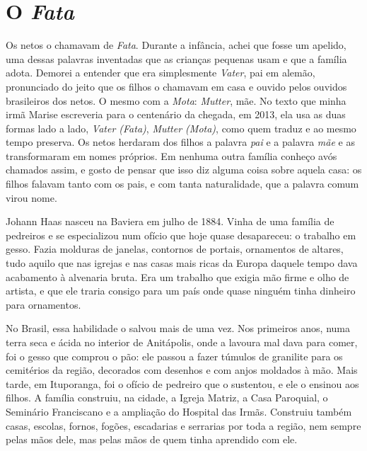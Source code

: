 \documentclass[
  brazilian,
  11pt,
  openany]{book}
\begin{document}
\section{\texorpdfstring{O \emph{Fata}}{O Fata}}\label{o-fata}

Os netos o chamavam de \emph{Fata}. Durante a infância, achei que fosse
um apelido, uma dessas palavras inventadas que as crianças pequenas usam
e que a família adota. Demorei a entender que era simplesmente
\emph{Vater}, pai em alemão, pronunciado do jeito que os filhos o
chamavam em casa e ouvido pelos ouvidos brasileiros dos netos. O mesmo
com a \emph{Mota}: \emph{Mutter}, mãe. No texto que minha irmã Marise
escreveria para o centenário da chegada, em 2013, ela usa as duas formas
lado a lado, \emph{Vater (Fata)}, \emph{Mutter (Mota)}, como quem traduz
e ao mesmo tempo preserva. Os netos herdaram dos filhos a palavra
\emph{pai} e a palavra \emph{mãe} e as transformaram em nomes próprios.
Em nenhuma outra família conheço avós chamados assim, e gosto de pensar
que isso diz alguma coisa sobre aquela casa: os filhos falavam tanto com
os pais, e com tanta naturalidade, que a palavra comum virou nome.

Johann Haas nasceu na Baviera em julho de 1884. Vinha de uma família de
pedreiros e se especializou num ofício que hoje quase desapareceu: o
trabalho em gesso. Fazia molduras de janelas, contornos de portais,
ornamentos de altares, tudo aquilo que nas igrejas e nas casas mais
ricas da Europa daquele tempo dava acabamento à alvenaria bruta. Era um
trabalho que exigia mão firme e olho de artista, e que ele traria
consigo para um país onde quase ninguém tinha dinheiro para ornamentos.

No Brasil, essa habilidade o salvou mais de uma vez. Nos primeiros anos,
numa terra seca e ácida no interior de Anitápolis, onde a lavoura mal
dava para comer, foi o gesso que comprou o pão: ele passou a fazer
túmulos de granilite para os cemitérios da região, decorados com
desenhos e com anjos moldados à mão. Mais tarde, em Ituporanga, foi o
ofício de pedreiro que o sustentou, e ele o ensinou aos filhos. A
família construiu, na cidade, a Igreja Matriz, a Casa Paroquial, o
Seminário Franciscano e a ampliação do Hospital das Irmãs. Construiu
também casas, escolas, fornos, fogões, escadarias e serrarias por toda a
região, nem sempre pelas mãos dele, mas pelas mãos de quem tinha
aprendido com ele.
\end{document}
